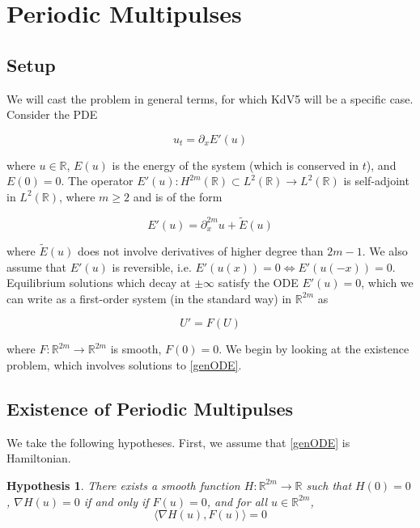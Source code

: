\documentclass[12pt]{article}
\def\R{{\mathbb R}}
\newtheorem{hypothesis}{Hypothesis}
\begin{document}
\section{Periodic Multipulses}

\subsection{Setup}

We will cast the problem in general terms, for which KdV5 will be a specific case. Consider the PDE

\begin{equation}\label{genPDE}
u_t = \partial_x E'(u)
\end{equation}

where $u \in \R$, $E(u)$ is the energy of the system (which is conserved in $t$), and $E(0) = 0$. The operator $E'(u): H^{2m}(\R) \subset L^2(\R) \rightarrow L^2(\R)$ is self-adjoint in $L^2(\R)$, where $m \geq 2$ and is of the form

\[
E'(u) = \partial_x^{2m}u + \tilde{E}(u)
\]

where $\tilde{E}(u)$ does not involve derivatives of higher degree than $2m-1$. We also assume that $E'(u)$ is reversible, i.e. $E'(u(x)) = 0 \iff E'(u(-x)) = 0$.
\\

Equilibrium solutions which decay at $\pm \infty$ satisfy the ODE $E'(u) = 0$, which we can write as a first-order system (in the standard way) in $\R^{2m}$ as

\begin{equation}\label{genODE}
U' = F(U)
\end{equation}

where $F: \R^{2m} \rightarrow \R^{2m}$ is smooth, $F(0) = 0$. We begin by looking at the existence problem, which involves solutions to \eqref{genODE}.

\subsection{Existence of Periodic Multipulses}

We take the following hypotheses. First, we assume that \eqref{genODE} is Hamiltonian.

\begin{hypothesis}\label{Hhyp}
There exists a smooth function $H: \R^{2m} \rightarrow \R$ such that $H(0) = 0$, $\nabla H(u) = 0$ if and only if $F(u) = 0$, and for all $u \in \R^{2m}$,
\begin{equation}
\langle \nabla H(u), F(u) \rangle = 0
\end{equation}
\end{hypothesis}
\end{document}
